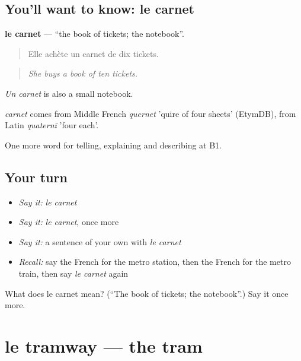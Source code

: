 \subsection*{You'll want to know: le carnet}
\textbf{le carnet} — \textquotedblleft{}the book of tickets; the notebook\textquotedblright{}.

\begin{quote}
Elle achète un carnet de dix tickets.
\end{quote}

\begin{quote}
\emph{She buys a book of ten tickets.}
\end{quote}

\emph{Un carnet} is also a small notebook.

\begin{cousinweb}
\emph{carnet} comes from Middle French \emph{quernet} 'quire of four sheets' (EtymDB), from Latin \emph{quaternī} 'four each'.
\end{cousinweb}

\begin{grammarlens}[title={What you've built}]
One more word for telling, explaining and describing at B1.
\end{grammarlens}

\subsection*{Your turn}
\begin{itemize}
\raggedright
  \item \emph{Say it:} \emph{le carnet}
  \item \emph{Say it:} \emph{le carnet}, once more
  \item \emph{Say it:} a sentence of your own with \emph{le carnet}
  \item \emph{Recall:} say the French for the metro station, then the French for the metro train, then say \emph{le carnet} again
\end{itemize}

\begin{tcolorbox}[breakable,colback=teal!4,colframe=teal!35!black,title={Before you move on}]
What does le carnet mean? (\textquotedblleft{}The book of tickets; the notebook\textquotedblright{}.) Say it once more.
\end{tcolorbox}
\section[le tramway]{le tramway — the tram}

